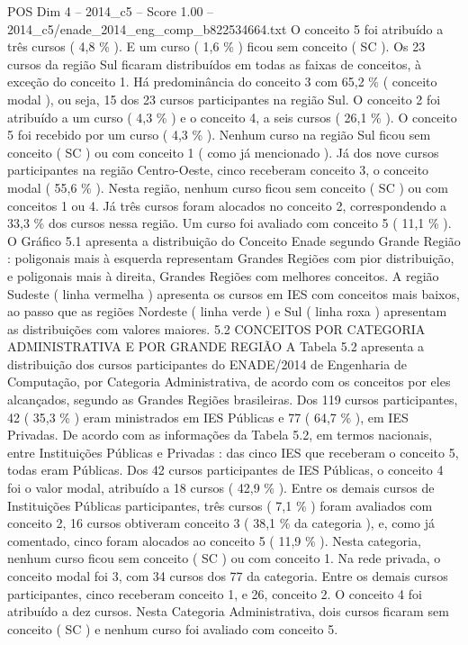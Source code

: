 \begin{textsample}{POS Dim 4 – 2014\_c5 – Score 1.00 – 2014\_c5/enade\_2014\_eng\_comp\_b822534664.txt}
O conceito 5 foi atribuído a três cursos ( 4,8 \% ).
E um curso ( 1,6 \% ) ficou sem conceito ( SC ).
Os 23 cursos da região Sul ficaram distribuídos em todas as faixas de conceitos, à exceção do conceito 1.
Há predominância do conceito 3 com 65,2 \% ( conceito modal ), ou seja, 15 dos 23 cursos participantes na região Sul.
O conceito 2 foi atribuído a um curso ( 4,3 \% ) e o conceito 4, a seis cursos ( 26,1 \% ).
O conceito 5 foi recebido por um curso ( 4,3 \% ).
Nenhum curso na região Sul ficou sem conceito ( SC ) ou com conceito 1 ( como já mencionado ).
Já dos nove cursos participantes na região Centro-Oeste, cinco receberam conceito 3, o conceito modal ( 55,6 \% ).
Nesta região, nenhum curso ficou sem conceito ( SC ) ou com conceitos 1 ou 4.
Já três cursos foram alocados no conceito 2, correspondendo a 33,3 \% dos cursos nessa região.
Um curso foi avaliado com conceito 5 ( 11,1 \% ).
O Gráfico 5.1 apresenta a distribuição do Conceito Enade segundo Grande Região : poligonais mais à esquerda representam Grandes Regiões com pior distribuição, e poligonais mais à direita, Grandes Regiões com melhores conceitos.
A região Sudeste ( linha vermelha ) apresenta os cursos em IES com conceitos mais baixos, ao passo que as regiões Nordeste ( linha verde ) e Sul ( linha roxa ) apresentam as distribuições com valores maiores. 5.2 CONCEITOS POR CATEGORIA ADMINISTRATIVA E POR GRANDE REGIÃO A Tabela 5.2 apresenta a distribuição dos cursos participantes do ENADE/2014 de Engenharia de Computação, por Categoria Administrativa, de acordo com os conceitos por eles alcançados, segundo as Grandes Regiões brasileiras.
Dos 119 cursos participantes, 42 ( 35,3 \% ) eram ministrados em IES Públicas e 77 ( 64,7 \% ), em IES Privadas.
De acordo com as informações da Tabela 5.2, em termos nacionais, entre Instituições Públicas e Privadas : das cinco IES que receberam o conceito 5, todas eram Públicas.
Dos 42 cursos participantes de IES Públicas, o conceito 4 foi o valor modal, atribuído a 18 cursos ( 42,9 \% ).
Entre os demais cursos de Instituições Públicas participantes, três cursos ( 7,1 \% ) foram avaliados com conceito 2, 16 cursos obtiveram conceito 3 ( 38,1 \% da categoria ), e, como já comentado, cinco foram alocados ao conceito 5 ( 11,9 \% ).
Nesta categoria, nenhum curso ficou sem conceito ( SC ) ou com conceito 1.
Na rede privada, o conceito modal foi 3, com 34 cursos dos 77 da categoria.
Entre os demais cursos participantes, cinco receberam conceito 1, e 26, conceito 2.
O conceito 4 foi atribuído a dez cursos.
Nesta Categoria Administrativa, dois cursos ficaram sem conceito ( SC ) e nenhum curso foi avaliado com conceito 5.

\end{textsample}
